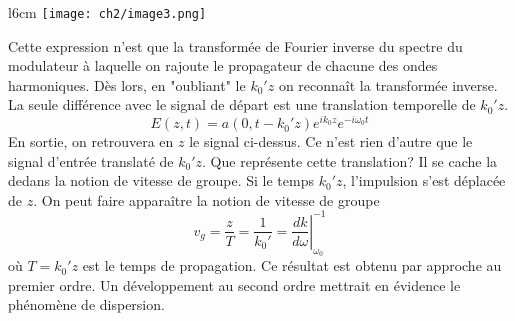 \begin{wrapfigure}[7]{l}{6cm}
\vspace{-5mm}
\texttt{[image: ch2/image3.png]}
\end{wrapfigure}
Cette expression n'est que la transformée de Fourier inverse du spectre du modulateur à laquelle 
on rajoute le propagateur de chacune des ondes harmoniques. Dès lors, en "oubliant" le $k_0'z$ 
on reconnaît la transformée inverse. La seule différence avec le signal de départ est une 
translation temporelle de $k_0'z$.
\begin{equation}
E(z,t) = a(0,t-k_0'z)e^{ik_0z}e^{-i\omega_0t}
\end{equation}
En sortie, on retrouvera en $z$ le signal ci-dessus. Ce n'est rien d'autre que le signal d'entrée 
translaté de $k_0'z$. Que représente cette translation? Il se cache la dedans la notion de 
vitesse de groupe. Si le temps $k_0'z$, l'impulsion s'est déplacée de $z$. On peut faire 
apparaître la notion de vitesse de groupe
\begin{equation}
v_g = \dfrac{z}{T} = \dfrac{1}{k_0'} = \left.\dfrac{dk}{d\omega}\right|_{\omega_0}^{-1}
\end{equation}
où $T = k_0'z$ est le temps de propagation. Ce résultat est obtenu par approche au premier 
ordre. Un développement au second ordre mettrait en évidence le phénomène de dispersion.























